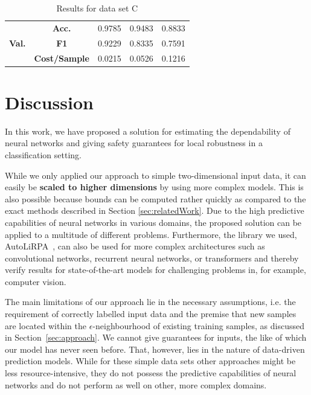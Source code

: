 \documentclass[acmsmall,nonacm]{acmart}
\begin{document}
\begin{table}[H]
{\begin{tabular}{cccllcllccc}
  \multicolumn{1}{|l|}{\multirow{3}{*}{\textbf{Val.}}} & \multicolumn{1}{c|}{\textbf{Acc.}} & \multicolumn{3}{c|}{0.9785} & \multicolumn{3}{c|}{0.9483} & \multicolumn{3}{c|}{0.8833} \\ \cline{2-11} 
  \multicolumn{1}{|l|}{} & \multicolumn{1}{c|}{\textbf{F1}} & \multicolumn{3}{c|}{0.9229} & \multicolumn{3}{c|}{0.8335} & \multicolumn{3}{c|}{0.7591} \\ \cline{2-11} 
  \multicolumn{1}{|l|}{} & \multicolumn{1}{l|}{\textbf{Cost/Sample}} & \multicolumn{3}{c|}{0.0215} & \multicolumn{3}{c|}{0.0526} & \multicolumn{3}{c|}{0.1216} \\ \hline
  \end{tabular}}
  \caption{Results for data set C}
  \label{tab:results_c}
  \end{table}


\section{Discussion}
In this work, we have proposed a solution for estimating the dependability of neural networks and giving safety guarantees for local robustness in a classification setting.

While we only applied our approach to simple two-dimensional input data, it can easily be \textbf{scaled to higher dimensions} by using more complex models. This is also possible because bounds can be computed rather quickly as compared to the exact methods described in Section \ref{sec:relatedWork}. Due to the high predictive capabilities of neural networks in various domains, the proposed solution can be applied to a multitude of different problems. Furthermore, the library we used, AutoLiRPA~\cite{xu2020autoLiRPA}, can also be used for more complex architectures such as convolutional networks, recurrent neural networks, or transformers and thereby verify results for state-of-the-art models for challenging problems in, for example, computer vision.

The main limitations of our approach lie in the necessary assumptions, i.e. the requirement of correctly labelled input data and the premise that new samples are located within the $\epsilon$-neighbourhood of existing training samples, as discussed in Section~\ref{sec:approach}. We cannot give guarantees for inputs, the like of which our model has never seen before. That, however, lies in the nature of data-driven prediction models. While for these simple data sets other approaches might be less resource-intensive, they do not possess the predictive capabilities of neural networks and do not perform as well on other, more complex domains.
\end{document}
